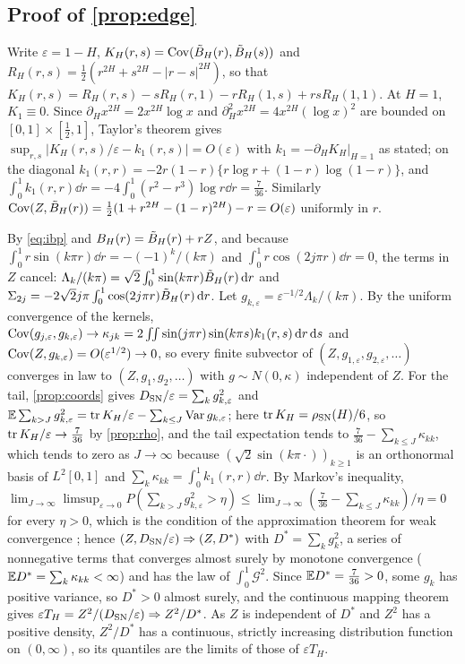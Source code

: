 \subsection{Proof of \texorpdfstring{\cref{prop:edge}}{the growth proposition}}
Write $\varepsilon=1-H$, $K_H(r,s)=\operatorname{Cov}(\tilde B_H(r),\tilde B_H(s))$ and $R_H(r,s)=\frac12(r^{2H}+s^{2H}-|r-s|^{2H})$, so that
$K_H(r,s)=R_H(r,s)-sR_H(r,1)-rR_H(1,s)+rsR_H(1,1)$. At $H=1$, $K_1\equiv0$. Since $\partial_Hx^{2H}=2x^{2H}\log x$ and
$\partial_H^2x^{2H}=4x^{2H}(\log x)^2$ are bounded on $[0,1]\times[\frac12,1]$, Taylor's theorem gives
$\sup_{r,s}|K_H(r,s)/\varepsilon-k_1(r,s)|=O(\varepsilon)$ with $k_1=-\partial_HK_H|_{H=1}$ as stated; on the diagonal
$k_1(r,r)=-2r(1-r)\{r\log r+(1-r)\log(1-r)\}$, and $\int_0^1k_1(r,r)\dd r=-4\int_0^1(r^2-r^3)\log r\dd r=\frac7{36}$.
Similarly $\operatorname{Cov}(Z,\tilde B_H(r))=\frac12(1+r^{2H}-(1-r)^{2H})-r=O(\varepsilon)$ uniformly in $r$.

By \eqref{eq:ibp} and $B_H(r)=\tilde B_H(r)+rZ$, and because $\int_0^1r\sin(k\pi r)\dd r=-(-1)^k/(k\pi)$ and
$\int_0^1r\cos(2j\pi r)\dd r=0$, the terms in $Z$ cancel:
$\Lambda_k/(k\pi)=\sqrt2\int_0^1\sin(k\pi r)\tilde B_H(r)\,\mathrm d r$ and $\Sigma_{2j}=-2\sqrt2j\pi\int_0^1\cos(2j\pi r)\tilde B_H(r)\,\mathrm d r$.
Let $g_{k,\varepsilon}=\varepsilon^{-1/2}\Lambda_k/(k\pi)$. By the uniform convergence of the kernels,
$\operatorname{Cov}(g_{j,\varepsilon},g_{k,\varepsilon})\to\kappa_{jk}=2\iint\sin(j\pi r)\sin(k\pi s)k_1(r,s)\,\mathrm d r\,\mathrm d s$ and
$\operatorname{Cov}(Z,g_{k,\varepsilon})=O(\varepsilon^{1/2})\to0$, so every finite subvector of $(Z,g_{1,\varepsilon},g_{2,\varepsilon},\dots)$
converges in law to $(Z,g_1,g_2,\dots)$ with $g\sim N(0,\kappa)$ independent of $Z$. For the tail, \cref{prop:coords}
gives $D_{\mathrm{SN}}/\varepsilon=\sum_kg_{k,\varepsilon}^2$ and
$\mathbb E\sum_{k>J}g_{k,\varepsilon}^2=\operatorname{tr} K_H/\varepsilon-\sum_{k\le J}\operatorname{Var} g_{k,\varepsilon}$; here
$\operatorname{tr} K_H=\rho_{\mathrm{SN}}(H)/6$, so $\operatorname{tr} K_H/\varepsilon\to\frac7{36}$ by \cref{prop:rho}, and the tail expectation tends to
$\frac7{36}-\sum_{k\le J}\kappa_{kk}$, which tends to zero as $J\to\infty$ because $(\sqrt2\sin(k\pi\cdot))_{k\ge1}$ is an
orthonormal basis of $L^2[0,1]$ and $\sum_k\kappa_{kk}=\int_0^1k_1(r,r)\dd r$. By Markov's inequality,
$\lim_{J\to\infty}\limsup_{\varepsilon\to0}P(\sum_{k>J}g_{k,\varepsilon}^2>\eta)\le\lim_{J\to\infty}(\frac7{36}-\sum_{k\le J}\kappa_{kk})/\eta=0$
for every $\eta>0$, which is the condition of the approximation theorem for weak convergence
\citep[Theorem~3.2]{Bil99}; hence $(Z,D_{\mathrm{SN}}/\varepsilon)\Rightarrow(Z,D^*)$ with $D^*=\sum_kg_k^2$, a series of nonnegative
terms that converges almost surely by monotone convergence ($\mathbb E D^*=\sum_k\kappa_{kk}<\infty$) and has the law of
$\int_0^1\mathcal G^2$. Since $\mathbb E D^*=\frac7{36}>0$, some $g_k$ has positive variance, so $D^*>0$ almost surely, and
the continuous mapping theorem gives $\varepsilon T_H=Z^2/(D_{\mathrm{SN}}/\varepsilon)\Rightarrow Z^2/D^*$. As $Z$ is independent
of $D^*$ and $Z^2$ has a positive density, $Z^2/D^*$ has a continuous, strictly increasing distribution function on
$(0,\infty)$, so its quantiles are the limits of those of $\varepsilon T_H$.

